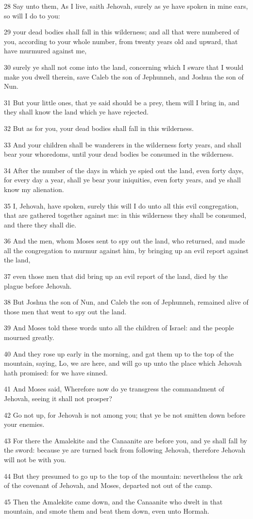 \par 28 Say unto them, As I live, saith Jehovah, surely as ye have spoken in mine ears, so will I do to you:
\par 29 your dead bodies shall fall in this wilderness; and all that were numbered of you, according to your whole number, from twenty years old and upward, that have murmured against me,
\par 30 surely ye shall not come into the land, concerning which I sware that I would make you dwell therein, save Caleb the son of Jephunneh, and Joshua the son of Nun.
\par 31 But your little ones, that ye said should be a prey, them will I bring in, and they shall know the land which ye have rejected.
\par 32 But as for you, your dead bodies shall fall in this wilderness.
\par 33 And your children shall be wanderers in the wilderness forty years, and shall bear your whoredoms, until your dead bodies be consumed in the wilderness.
\par 34 After the number of the days in which ye spied out the land, even forty days, for every day a year, shall ye bear your iniquities, even forty years, and ye shall know my alienation.
\par 35 I, Jehovah, have spoken, surely this will I do unto all this evil congregation, that are gathered together against me: in this wilderness they shall be consumed, and there they shall die.
\par 36 And the men, whom Moses sent to spy out the land, who returned, and made all the congregation to murmur against him, by bringing up an evil report against the land,
\par 37 even those men that did bring up an evil report of the land, died by the plague before Jehovah.
\par 38 But Joshua the son of Nun, and Caleb the son of Jephunneh, remained alive of those men that went to spy out the land.
\par 39 And Moses told these words unto all the children of Israel: and the people mourned greatly.
\par 40 And they rose up early in the morning, and gat them up to the top of the mountain, saying, Lo, we are here, and will go up unto the place which Jehovah hath promised: for we have sinned.
\par 41 And Moses said, Wherefore now do ye transgress the commandment of Jehovah, seeing it shall not prosper?
\par 42 Go not up, for Jehovah is not among you; that ye be not smitten down before your enemies.
\par 43 For there the Amalekite and the Canaanite are before you, and ye shall fall by the sword: because ye are turned back from following Jehovah, therefore Jehovah will not be with you.
\par 44 But they presumed to go up to the top of the mountain: nevertheless the ark of the covenant of Jehovah, and Moses, departed not out of the camp.
\par 45 Then the Amalekite came down, and the Canaanite who dwelt in that mountain, and smote them and beat them down, even unto Hormah.


